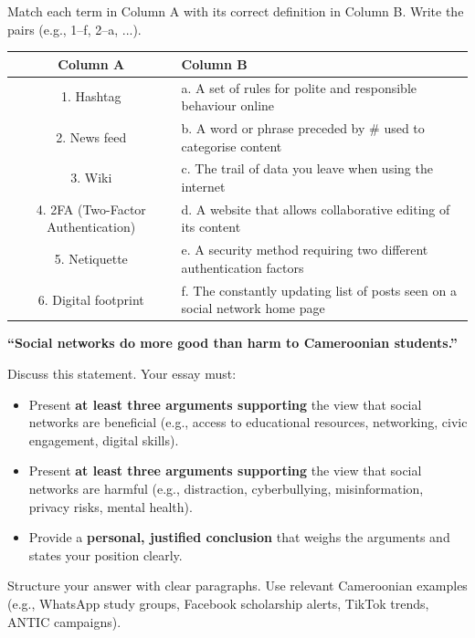 \documentclass[11pt]{article}
\newcounter{popsec}
\newcounter{popsub}
\newcommand{\courssub}[1]{%
  \stepcounter{popsub}%
  \par\vspace{9pt}\noindent{\popxbold\fontsize{11.5}{13}\selectfont\color{popink}{\color{poporange}\thepopsec.\thepopsub}\hspace{6pt}#1}\par\nopagebreak\vspace{4pt}
}
\begin{document}
\begin{exercice}
Match each term in Column A with its correct definition in Column B. Write the pairs (e.g., 1--f, 2--a, ...).
\begin{center}
\begin{tabular}{|c|l|}\hline
\textbf{Column A} & \textbf{Column B} \\ \hline
1. Hashtag & a. A set of rules for polite and responsible behaviour online \\ \hline
2. News feed & b. A word or phrase preceded by \# used to categorise content \\ \hline
3. Wiki & c. The trail of data you leave when using the internet \\ \hline
4. 2FA (Two-Factor Authentication) & d. A website that allows collaborative editing of its content \\ \hline
5. Netiquette & e. A security method requiring two different authentication factors \\ \hline
6. Digital footprint & f. The constantly updating list of posts seen on a social network home page \\ \hline
\end{tabular}
\end{center}
\end{exercice}

\courssub{I prepare for the GCE}

\begin{exercice}
\textbf{``Social networks do more good than harm to Cameroonian students.''}

Discuss this statement. Your essay must:
\begin{itemize}
    \item Present \textbf{at least three arguments supporting} the view that social networks are beneficial (e.g., access to educational resources, networking, civic engagement, digital skills).
    \item Present \textbf{at least three arguments supporting} the view that social networks are harmful (e.g., distraction, cyberbullying, misinformation, privacy risks, mental health).
    \item Provide a \textbf{personal, justified conclusion} that weighs the arguments and states your position clearly.
\end{itemize}
Structure your answer with clear paragraphs. Use relevant Cameroonian examples (e.g., WhatsApp study groups, Facebook scholarship alerts, TikTok trends, ANTIC campaigns).
\end{exercice}
\end{document}
